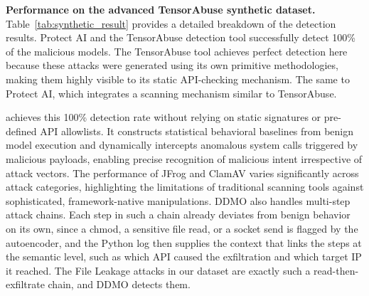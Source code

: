 %

\noindent \textbf{Performance on the advanced TensorAbuse synthetic dataset.} Table~\ref{tab:synthetic_result} provides a detailed breakdown of the detection results. Protect AI and the TensorAbuse detection tool successfully detect 100\% of the malicious models. The TensorAbuse tool achieves perfect detection here because these attacks were generated using its own primitive methodologies, making them highly visible to its static API-checking mechanism. The same to Protect AI, which integrates a scanning mechanism similar to TensorAbuse. 

\toolname{} achieves this 100\% detection rate without relying on static signatures or pre-defined API allowlists. It constructs statistical behavioral baselines from benign model execution and dynamically intercepts anomalous system calls triggered by malicious payloads, enabling precise recognition of malicious intent irrespective of attack vectors. The performance of JFrog and ClamAV varies significantly across attack categories, highlighting the limitations of traditional scanning tools against sophisticated, framework-native manipulations. DDMO also handles multi-step attack chains. Each step in such a chain already deviates from benign behavior on its own, since a chmod, a sensitive file read, or a socket send is flagged by the autoencoder, and the Python log then supplies the context that links the steps at the semantic level, such as which API caused the exfiltration and which target IP it reached. The File Leakage attacks in our dataset are exactly such a read-then-exfiltrate chain, and DDMO detects them.


